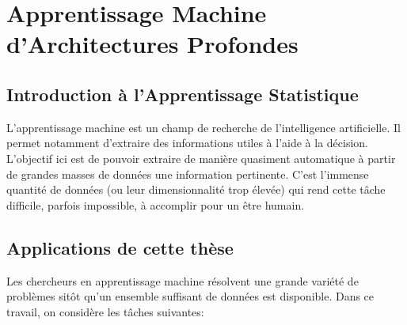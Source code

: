 \chapter{Apprentissage Machine d'Architectures Profondes}
\label{chap:basic}

\section{Introduction à l'Apprentissage Statistique}

L'apprentissage machine est un champ de recherche de l'intelligence
artificielle. Il permet notamment d'extraire des informations utiles à l'aide à
la décision.  L'objectif ici est de pouvoir extraire de manière quasiment
automatique à partir de grandes masses de données une information pertinente.
C'est l'immense quantité de données (ou leur dimensionnalité trop élevée)  qui
rend cette tâche difficile, parfois impossible, à accomplir pour un être
humain.

\section{Applications de cette thèse}

Les chercheurs en apprentissage machine résolvent une grande variété de
problèmes sitôt qu'un ensemble suffisant de données est disponible. Dans ce
travail, on considère les tâches suivantes:
\\

